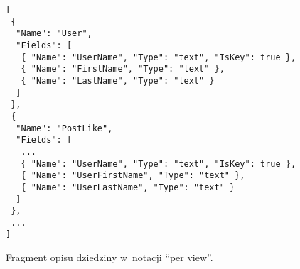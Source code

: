 \begin{figure}[!ht]
\begin{verbatim}
[
 {
  "Name": "User",
  "Fields": [
   { "Name": "UserName", "Type": "text", "IsKey": true },
   { "Name": "FirstName", "Type": "text" },
   { "Name": "LastName", "Type": "text" }
  ]
 },
 {
  "Name": "PostLike",
  "Fields": [
   ...
   { "Name": "UserName", "Type": "text", "IsKey": true },
   { "Name": "UserFirstName", "Type": "text" },
   { "Name": "UserLastName", "Type": "text" }
  ]
 },
 ...
]
\end{verbatim}
\caption{Fragment opisu dziedziny w~notacji ``per view''.}
\label{fig:single:model_perView}
\end{figure}
